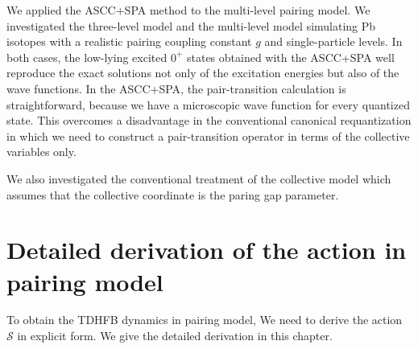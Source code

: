 \documentclass[11pt]{book} %
\begin{document}
We applied the ASCC+SPA method to the multi-level pairing model.
We investigated the three-level model and 
the multi-level model simulating Pb isotopes
with a realistic pairing coupling constant $g$ and single-particle levels.
In both cases, the low-lying excited $0^+$ states obtained with
the ASCC+SPA well reproduce the exact solutions
not only of the excitation energies but also of the wave functions.
In the ASCC+SPA, the pair-transition calculation is straightforward,
because we have a microscopic wave function for every quantized state.
This overcomes a disadvantage in the conventional canonical requantization
in which we need to construct a pair-transition operator
in terms of the collective variables only.

We also investigated the conventional treatment of the
collective model which assumes that the collective coordinate
is the paring gap parameter.

\clearpage{\pagestyle{empty}\cleardoublepage}
\appendix

\chapter{Detailed derivation of the action in pairing model}
\label{derivation}
To obtain the TDHFB dynamics in pairing model, We need to derive the action $\mathcal{S}$ in explicit form. We give the detailed derivation in this chapter.
\end{document}
